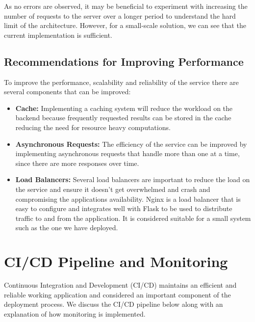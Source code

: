 \documentclass{surreydissertation}
\begin{document}
As no errors are observed, it may be beneficial to experiment with increasing the number of requests to the server over a longer period to understand the hard limit of the architecture. However, for a small-scale solution, we can see that the current implementation is sufficient.

\subsection{Recommendations for Improving Performance}
To improve the performance, scalability and reliability of the service there are several components that can be improved:

\begin{itemize}
    \item \textbf{Cache:} Implementing a caching system will reduce the workload on the backend because frequently requested results can be stored in the cache reducing the need for resource heavy computations. 
    \item \textbf{Asynchronous Requests:} The efficiency of the service can be improved by implementing asynchronous requests that handle more than one at a time, since there are more responses over time.
    \item \textbf{Load Balancers:} Several load balancers are important to reduce the load on the service and ensure it doesn't get overwhelmed and crash and compromising the applications availability. Nginx is a load balancer that is easy to configure and integrates well with Flask to be used to distribute traffic to and from the application. It is considered suitable for a small system such as the one we have deployed.
\end{itemize}


\section{CI/CD Pipeline and Monitoring}
Continuous Integration and Development (CI/CD) maintains an efficient and reliable working application and considered an important component of the deployment process. We discuss the CI/CD pipeline below along with an explanation of how monitoring is implemented.
\end{document}

